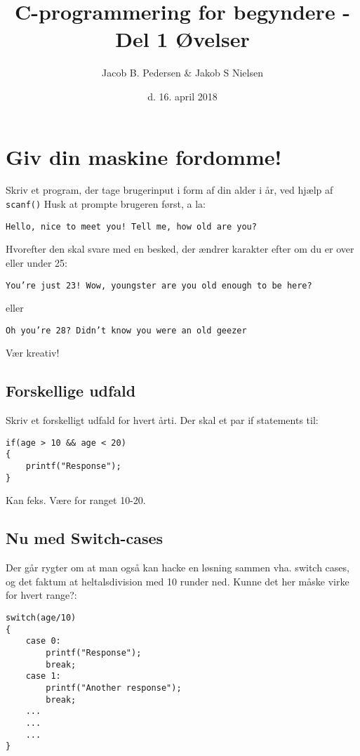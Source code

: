 \documentclass[hidelinks]{article} %
\title{C-programmering for begyndere - Del 1
 		\break
 		\break
		\large Øvelser} %
\date{d. 16. april 2018} %
\author{Jacob B. Pedersen \break \& \break Jakob S Nielsen} %
\begin{document}

\section{Giv din maskine fordomme!}	
Skriv et program, der tage brugerinput i form af din alder i år, ved hjælp af \lstinline{scanf()}
Husk at prompte brugeren først, a la:
\begin{lstlisting}
Hello, nice to meet you! Tell me, how old are you?
\end{lstlisting}
Hvorefter den skal svare med en besked, der ændrer karakter efter om du er over eller under 25:
\begin{lstlisting}
You’re just 23! Wow, youngster are you old enough to be here?
\end{lstlisting}
eller
\begin{lstlisting}
Oh you’re 28? Didn’t know you were an old geezer
\end{lstlisting}
Vær kreativ!

\subsection{Forskellige udfald}
Skriv et forskelligt udfald for hvert årti. Der skal et par if statements til:
\begin{lstlisting}
if(age > 10 && age < 20)
{
	printf("Response");
}
\end{lstlisting}
Kan feks. Være for ranget 10-20.

\subsection{Nu med Switch-cases}
Der går rygter om at man også kan hacke en løsning sammen vha. switch cases, og det faktum at heltalsdivision med 10 runder ned. Kunne det her måske virke for hvert range?:
\begin{lstlisting}
switch(age/10)
{
	case 0:
		printf("Response");
		break;
	case 1:
		printf("Another response");
		break;
	...
	...
	...
}
\end{lstlisting}
\pagebreak
\end{document}
